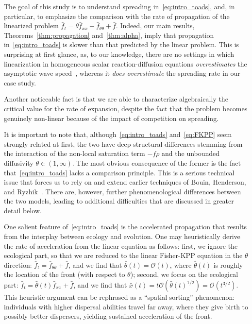 \documentclass[10pt]{amsart}
\theoremstyle{definition}\newtheorem{defi}[theo]{Definition}\newtheorem{rema}[theo]{Remark}\newtheorem{exam}[theo]{Example}\newtheorem{exem}[theo]{Example}\newtheorem{nota}[theo]{Notation}
\newcommand{\mO}{\mathcal{O}}
\newcommand{\1}{\mathds{1}}
\begin{document}
The goal of this study is to understand spreading in~\eqref{eq:intro_toads}, and, in particular, to emphasize the comparison with the rate of propagation of the linearized problem $\bar f_t = \theta \bar f_{xx} + \bar f_{\theta\theta} + \bar f$. Indeed, our main results, Theorems~\ref{thm:propagation} and~\ref{thm:alpha}, imply that propagation in~\eqref{eq:intro_toads} is slower than that predicted by the linear problem. This is surprising at first glance, as, to our knowledge, there are no settings in which linearization in homogeneous scalar reaction-diffusion equations \emph{overestimates} the asymptotic wave speed~\cite{crooks_travelling_2003,hadeler_travelling_1975,lucia_linear_2004}, whereas it \emph{does overestimate} the spreading rate in our case study.

Another noticeable fact is that we are able to characterize algebraically the critical value for the rate of expansion, despite the fact that the problem becomes genuinely non-linear because of the impact of competition on spreading.



It is important to note that, although~\eqref{eq:intro_toads} and~\eqref{eq:FKPP} seem strongly related at first, the two have deep structural differences stemming from the interaction of the non-local saturation term $-f\rho$ and the unbounded diffusivity $\theta \in (1,\infty)$. The most obvious consequence of the former is the fact that~\eqref{eq:intro_toads} lacks a comparison principle. This is a serious technical issue that forces us to rely on and extend earlier techniques of Bouin, Henderson, and Ryzhik~\cite{BHR_acceleration}. There are, however, further phenomenological differences between the two models, leading to additional difficulties that are discussed in greater detail below.

One salient feature of~\eqref{eq:intro_toads} is the accelerated propagation that results from the interplay between ecology and evolution. One may heuristically derive the rate of acceleration from the linear equation as follows: first, we ignore the ecological part, so that we are reduced to the linear Fisher-KPP equation in the $\theta$ direction: $\bar f_t = \bar f_{\theta\theta} + \bar f$, and we find that $\bar \theta(t) = \mO(t)$, where $\bar \theta(t)$ is roughly the location of the front (with respect to $\theta$); second, we focus on the ecological part: $\bar f_t = \bar \theta(t) \bar f_{xx} + \bar f$, and we find that $\bar x(t) = t \mO(\bar \theta(t)^{1/2}) = \mO(t^{3/2}) $. This heuristic argument can be rephrased as a ``spatial sorting'' phenomenon: individuals with higher dispersal abilities travel far away, where they give birth to possibly better dispersers, yielding sustained acceleration of the front.
\end{document}
